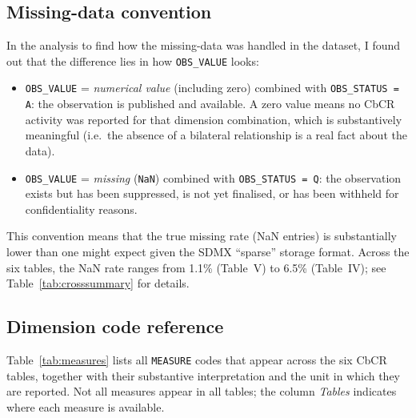 \documentclass[11pt,a4paper]{article}
\newcommand{\code}[1]{\texttt{#1}}
\begin{document}
\subsection{Missing-data convention}

In the analysis to find how the missing-data was handled in the dataset, I found out that the difference lies in how \code{OBS\_VALUE} looks:

\begin{itemize}
    \item \code{OBS\_VALUE} = \textit{numerical value} (including zero) combined with
          \code{OBS\_STATUS = A}: the observation is published and available. A
          zero value means no CbCR activity was reported for that dimension combination,
          which is substantively meaningful (i.e.\ the absence of a bilateral
          relationship is a real fact about the data).
    \item \code{OBS\_VALUE} = \textit{missing} (\texttt{NaN}) combined with
          \code{OBS\_STATUS = Q}: the observation exists but has been suppressed, is
          not yet finalised, or has been withheld for confidentiality reasons.
\end{itemize}

This convention means that the true missing rate (NaN entries) is substantially lower than one might expect given the SDMX ``sparse'' storage format. Across the six tables, the NaN rate ranges from 1.1\% (Table~V) to 6.5\% (Table~IV); see Table~\ref{tab:crosssummary} for details.

\subsection{Dimension code reference}\label{sec:dimensions}

Table~\ref{tab:measures} lists all \code{MEASURE} codes that appear across the six CbCR tables, together with their substantive interpretation and the unit in which they are reported. Not all measures appear in all tables; the column \emph{Tables} indicates where each measure is available.
\end{document}
